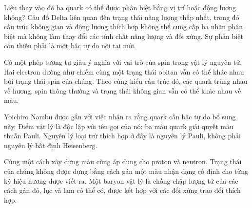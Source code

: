 Liệu thay vào đó ba quark có thể được phân biệt bằng vị trí hoặc động lượng không? Câu đố Delta liên quan đến trạng thái năng lượng thấp nhất, trong đó cấu trúc không gian và động lượng thích hợp không thể cung cấp ba nhãn phân biệt mà không làm thay đổi các tính chất năng lượng và đối xứng. Sự phân biệt còn thiếu phải là một bậc tự do nội tại mới.

Có một phép tương tự giàu ý nghĩa với vai trò của spin trong vật lý nguyên tử. Hai electron dường như chiếm cùng một trạng thái obitan vẫn có thể khác nhau bởi trạng thái spin của chúng. Theo cùng kiểu cấu trúc đó, các quark trùng nhau về hương, spin thông thường và trạng thái không gian vẫn có thể khác nhau về màu.


Yoichiro Nambu được gắn với việc nhận ra rằng quark cần bậc tự do bổ sung này. Điểm vật lý là độc lập với tên gọi của nó: ba màu quark giải quyết mâu thuẫn Pauli. Nguyên lý loại trừ thích hợp ở đây là nguyên lý Pauli, không phải nguyên lý bất định Heisenberg.


Cùng một cách xây dựng màu cũng áp dụng cho proton và neutron. Trạng thái của chúng không được dựng bằng cách gán một màu nhận dạng cố định cho từng ký hiệu hương được viết ra. Một baryon vật lý là chồng chập lượng tử của các cách gán đỏ, lục và lam có thể có, được kết hợp với các đối xứng trao đổi thích hợp.

\begin{classroomqa}
\end{classroomqa}

